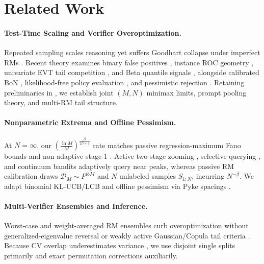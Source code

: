 \documentclass{article}
\theoremstyle{plain}
\theoremstyle{definition}
\theoremstyle{remark}
\begin{document}
\section{Related Work}
\label{sec:related}

\paragraph{Test-Time Scaling and Verifier Overoptimization.}
Repeated sampling scales reasoning \citep{brown2024large,snell2024scaling} yet suffers Goodhart collapse under imperfect RMs \citep{gao2023scaling}. Recent theory examines binary false positives \citep{stroebl2024inference}, instance ROC geometry \citep{dorner2025roc}, univariate EVT tail competition \citep{yano2026tail}, and Beta quantile signals \citep{gui2026whether}, alongside calibrated $\mathrm{BoN}$ \citep{tang2025carbon}, likelihood-free policy evaluation \citep{schweisthal2026efficient}, and pessimistic rejection \citep{huang2025best}. Retaining preliminaries in , we establish joint $(M,N)$ minimax limits, prompt pooling theory, and multi-RM tail structure.

\paragraph{Nonparametric Extrema and Offline Pessimism.}
At $N = \infty$, our $(\frac{\ln M}{M})^{\frac{\beta}{2\beta+1}}$ rate matches passive regression-maximum Fano bounds \citep{muller1985kernel,romano1988weak,tsybakov2009introduction} and non-adaptive stage-1 \citet{belitser2012optimal}. Active two-stage zooming \citep{belitser2012optimal}, selective querying \citep{minsker2013estimation}, and continuum bandits \citep{bubeck2011xarmed} adaptively query near peaks, whereas passive RM calibration draws $\mathcal{D}_M \sim P^{\otimes M}$ and $N$ unlabeled samples $S_{1:N}$, incurring $N^{-\beta}$. We adapt binomial $\mathrm{KL\text{-}UCB/LCB}$ \citep{garivier2011kl} and offline pessimism \citep{jin2021pessimism} via Pyke spacings \citep{pyke1965spacings}.

\paragraph{Multi-Verifier Ensembles and Inference.}
Worst-case and weight-averaged RM ensembles curb overoptimization \citep{coste2024reward,rame2024warm} without generalized-eigenvalue reversal or weakly active Gaussian/Copula tail criteria \citep{savage1962mills,hashorva2003multivariate,tankov2016tails,das2024heavy}. Because CV overlap underestimates variance \citep{nadeau2003inference}, we use disjoint single splits primarily and exact permutation corrections \citep{phipson2010permutation} auxiliarily.
\end{document}
